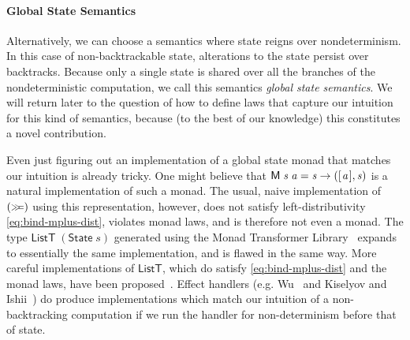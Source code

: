 \documentclass{llncs}
\newcommand{\Conid}[1]{\mathit{#1}}
\newcommand{\Varid}[1]{\mathit{#1}}
\let\Varid\mathit
\let\Conid\mathsf
\begin{document}
\paragraph{Global State Semantics}
Alternatively, we can choose a semantics where state reigns over nondeterminism.
In this case of non-backtrackable state, alterations to the state persist over
backtracks.
Because only a single state is shared over all the branches of the
nondeterministic computation, we call this semantics \emph{global state semantics}.
We will return later to the question of how to define laws that capture our
intuition for this kind of semantics, because (to the best of our knowledge)
this constitutes a novel contribution.

Even just figuring out an implementation of a global state monad that matches
our intuition is already tricky.
One might believe that \ensuremath{\Conid{M}\;\Varid{s}\;\Varid{a}\mathrel{=}\Varid{s}\to ([\mskip1.5mu \Varid{a}\mskip1.5mu],\Varid{s})} is a natural implementation of such a monad.
The usual, naive implementation of \ensuremath{(\mathrel{\hstretch{0.7}{>\!\!>\!\!=}})} using this representation, however, does not satisfy left-distributivity \eqref{eq:bind-mplus-dist}, violates monad laws, and is therefore not even a monad.
The type \ensuremath{\Conid{ListT}\;(\Conid{State}\;\Varid{s})} generated using the Monad Transformer Library~\cite{MTL:14} expands to essentially the same implementation, and is flawed in the same way.
More careful implementations of \ensuremath{\Conid{ListT}}, which do satisfy \eqref{eq:bind-mplus-dist} and the monad laws, have been proposed~\cite{Gale:07:ListT,Volkov:14:list-t}.
Effect handlers (e.g. Wu~\cite{Wu:14:Effect} and Kiselyov and
Ishii~\cite{KiselyovIshii:15:Freer}) do produce implementations which match our
intuition of a non-backtracking computation if we run the handler for
non-determinism before that of state.
\end{document}
